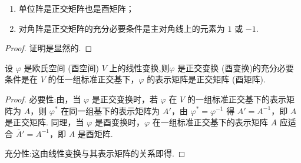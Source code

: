 \documentclass[../../main.tex]{subfiles}
\begin{document}
\begin{proposition}\label{proposition:常见的正交矩阵和酉矩阵}
\begin{enumerate}[(1)]
\item 单位阵是正交矩阵也是酉矩阵；

\item 对角阵是正交矩阵的充分必要条件是主对角线上的元素为 $1$ 或 $-1$. 
\end{enumerate}
\end{proposition}
\begin{proof}
证明是显然的.

\end{proof}

\begin{theorem}\label{theorem:正交变换和酉变换关于表示矩阵的充要条件}
设 $\varphi$ 是欧氏空间 (酉空间) $V$ 上的线性变换,则$\varphi$ 是正交变换 (酉变换)的充分必要条件是在 $V$ 的任一组标准正交基下，$\varphi$ 的表示矩阵是正交矩阵 (酉矩阵).
\end{theorem}
\begin{proof}
必要性:由，当 $\varphi$ 是正交变换时，若 $\varphi$ 在 $V$ 的一组标准正交基下的表示矩阵为 $A$，则 $\varphi^*$ 在同一组基下的表示矩阵为 $A'$，由 $\varphi^* = \varphi^{-1}$ 得 $A' = A^{-1}$，即 $A$ 是正交矩阵. 同理，当 $\varphi$ 是酉变换时，$\varphi$ 在一组标准正交基下的表示矩阵 $A$ 应适合 $\overline{A}' = A^{-1}$，即 $A$ 是酉矩阵.

充分性:这由线性变换与其表示矩阵的关系即得.

\end{proof}
\end{document}

